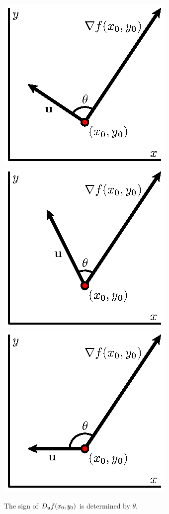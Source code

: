   \begin{figure}[ht]
    \begin{center}
      \includegraphics{figures/fig_10_6_gradient_angle_1.eps}
      \hspace*{20pt}
      \includegraphics{figures/fig_10_6_gradient_angle_2.eps}
      \hspace*{20pt}
      \includegraphics{figures/fig_10_6_gradient_angle_3.eps}
    \end{center}	
    \caption{The sign of $D_{\mathbf{u}} f(x_0,y_0)$ is determined by $\theta$.}
    \label{F:10.6.gradient.sign}
  \end{figure}


